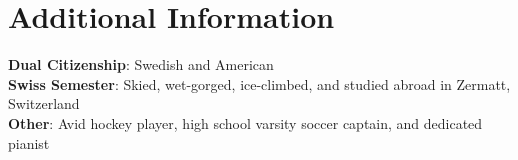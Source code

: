 \documentclass[letterpaper,11pt]{article}
\begin{document}

\section{Additional Information}
 \begin{itemize}[leftmargin=0.15in, label={}]
    \small{\item{
     \textbf{Dual Citizenship}{: Swedish and American} \\
     \textbf{Swiss Semester}{: Skied, wet-gorged, ice-climbed, and studied abroad in Zermatt, Switzerland} \\
     \textbf{Other}{: Avid hockey player, high school varsity soccer captain, and dedicated pianist}}}
 \end{itemize}

\end{document}
